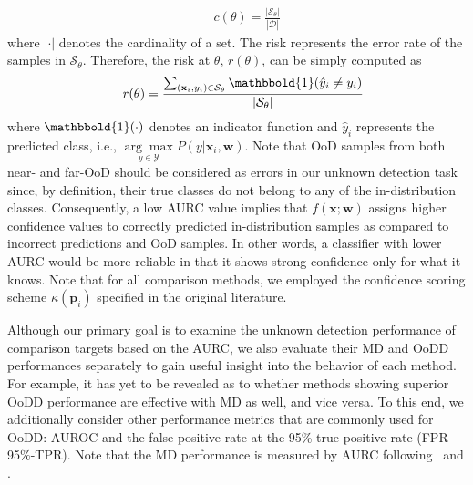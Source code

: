 \documentclass[preprint,12pt]{elsarticle}
\begin{document}
\begin{eqnarray}
\label{formula: coverage}
    && c(\theta) = \frac{|\mathcal{S}_{\theta}|}{|\mathcal{D}|}
    \nonumber
\end{eqnarray}
where $|\cdot|$ denotes the cardinality of a set.
The risk represents the error rate of the samples in $\mathcal{S}_{\theta}$. Therefore, the risk at $\theta$, $r(\theta)$, can be simply computed as 
\begin{eqnarray}
\label{formula: risk}
    && r(\theta) = \frac{
    \sum_{(\mathbf{x}_i,y_i) \in \mathcal{S}_{\theta}} \mathbbold{1}(\hat{y}_{i}\neq y_i)
    }
    {|\mathcal{S}_{\theta}|}
    \nonumber
\end{eqnarray}
where $\mathbbold{1}(\cdot)$ denotes an indicator function and $\hat{y}_{i}$ represents the predicted class, i.e., $\underset{y\in\mathcal{Y}}{\arg\max}P(y|\mathbf{x}_i, \mathbf{w})$. Note that OoD samples from both near- and far-OoD should be considered as errors in our unknown detection task since, by definition, their true classes do not belong to any of the in-distribution classes. Consequently, a low AURC value implies that $f(\mathbf{x};\mathbf{w})$ assigns higher confidence values to correctly predicted in-distribution samples as compared to incorrect predictions and OoD samples. In other words, a classifier with lower AURC would be more reliable in that it shows strong confidence only for what it knows. Note that for all comparison methods, we employed the confidence scoring scheme $\kappa(\mathbf{p}_i)$ specified in the original literature.

Although our primary goal is to examine the unknown detection performance of comparison targets based on the AURC, we also evaluate their MD and OoDD performances separately to gain useful insight into the behavior of each method. For example, it has yet to be revealed as to whether methods showing superior OoDD performance are effective with MD as well, and vice versa. To this end, we additionally consider other performance metrics that are commonly used for OoDD: AUROC and the false positive rate at the 95\% true positive rate (FPR-95\%-TPR). Note that the MD performance is measured by AURC following~\cite{geifman2018bias} and \cite{moon2020confidence}.
\end{document}
